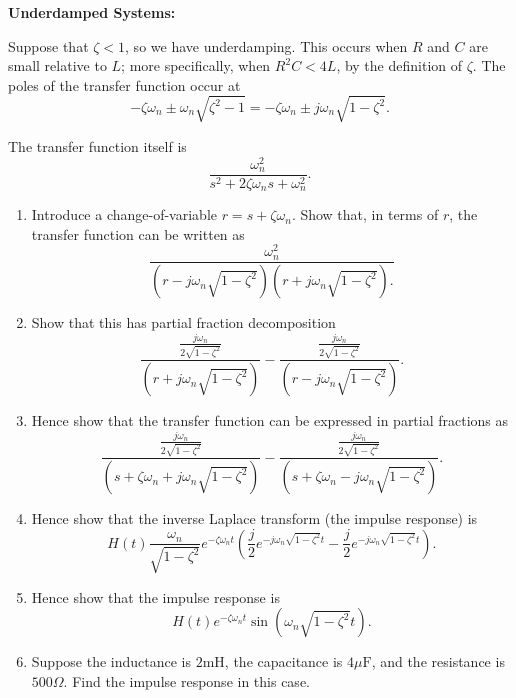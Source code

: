 \documentclass{article}
\begin{document}
\clearpage



\textbf{Underdamped Systems:}\bigskip

Suppose that $\zeta<1$, so we have underdamping. This occurs when $R$ and $C$ are small relative to $L$; more specifically, when $R^2C<4L$, by the definition of $\zeta$. The poles of the transfer function occur at
\[-\zeta\omega_n\pm\omega_n\sqrt{\zeta^2-1}=-\zeta\omega_n\pm j\omega_n\sqrt{1-\zeta^2}.\]

The transfer function itself is
\[\frac{\omega_n^2}{s^2+2\zeta\omega_ns+\omega_n^2}.\]


\begin{enumerate}
	\item Introduce a change-of-variable $r=s+\zeta\omega_n$. Show that, in terms of $r$, the transfer function can be written as
		\[\frac{\omega_n^2}{\left(r-j\omega_n\sqrt{1-\zeta^2}\right)\left(r+j\omega_n\sqrt{1-\zeta^2}\right).}\]
	\item Show that this has partial fraction decomposition
		\[\frac{\frac{j\omega_n}{2\sqrt{1-\zeta^2}}}{\left(r+j\omega_n\sqrt{1-\zeta^2}\right)} - \frac{\frac{j\omega_n}{2\sqrt{1-\zeta^2}}}{\left(r-j\omega_n\sqrt{1-\zeta^2}\right)}.\]
	\item Hence show that the transfer function can be expressed in partial fractions as
		\[\frac{\frac{j\omega_n}{2\sqrt{1-\zeta^2}}}{\left(s+\zeta\omega_n+j\omega_n\sqrt{1-\zeta^2}\right)} - \frac{\frac{j\omega_n}{2\sqrt{1-\zeta^2}}}{\left(s+\zeta\omega_n-j\omega_n\sqrt{1-\zeta^2}\right)}.\]
	\item Hence show that the inverse Laplace transform (the impulse response) is
		\[H(t)\frac{\omega_n}{\sqrt{1-\zeta^2}}e^{-\zeta\omega_n t}\left(\frac{j}{2}e^{-j\omega_n\sqrt{1-\zeta^2}t} - \frac{j}{2}e^{-j\omega_n\sqrt{1-\zeta^2}t} \right).\]
	\item Hence show that the impulse response is
		\[H(t)e^{-\zeta\omega_n t}\sin\left(\omega_n\sqrt{1-\zeta^2}t\right).\]
	\item Suppose the inductance is $2\mathrm{mH}$, the capacitance is $4\mu\mathrm{F}$, and the resistance is $500\Omega$. Find the impulse response in this case.
\end{enumerate}
\end{document}
